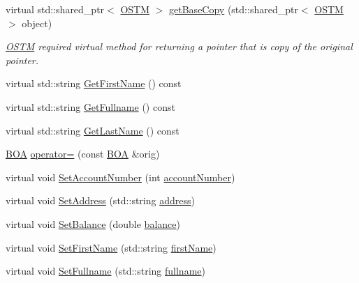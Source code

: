 \begin{DoxyCompactItemize}
\item 
virtual std\+::shared\+\_\+ptr$<$ \hyperlink{class_o_s_t_m}{O\+S\+TM} $>$ \hyperlink{class_b_o_a_a46ace5d3c945a423e93912673cadfad5_a46ace5d3c945a423e93912673cadfad5}{get\+Base\+Copy} (std\+::shared\+\_\+ptr$<$ \hyperlink{class_o_s_t_m}{O\+S\+TM} $>$ object)
\begin{DoxyCompactList}\small\item\em \hyperlink{class_o_s_t_m}{O\+S\+TM} required virtual method for returning a pointer that is copy of the original pointer. \end{DoxyCompactList}\item 
virtual std\+::string \hyperlink{class_b_o_a_ae6bb3df4e1fb210610325ffd1985c7c0_ae6bb3df4e1fb210610325ffd1985c7c0}{Get\+First\+Name} () const 
\item 
virtual std\+::string \hyperlink{class_b_o_a_afafa24a20fda93382782cab66a3079ee_afafa24a20fda93382782cab66a3079ee}{Get\+Fullname} () const 
\item 
virtual std\+::string \hyperlink{class_b_o_a_a081383edefc1f66b80c3fb8862ab070b_a081383edefc1f66b80c3fb8862ab070b}{Get\+Last\+Name} () const 
\item 
\hyperlink{class_b_o_a}{B\+OA} \hyperlink{class_b_o_a_af24b66f0e072b29abbbe5812cab48369_af24b66f0e072b29abbbe5812cab48369}{operator=} (const \hyperlink{class_b_o_a}{B\+OA} \&orig)
\item 
virtual void \hyperlink{class_b_o_a_a6b85963680344bd719ab862a50a09588_a6b85963680344bd719ab862a50a09588}{Set\+Account\+Number} (int \hyperlink{class_b_o_a_a86ca4ad716db205f04c337b39b34d9ba_a86ca4ad716db205f04c337b39b34d9ba}{account\+Number})
\item 
virtual void \hyperlink{class_b_o_a_a2568c0027af6534bd08dde882e892caf_a2568c0027af6534bd08dde882e892caf}{Set\+Address} (std\+::string \hyperlink{class_b_o_a_afb2d7d0c5c05169a72bbc6f1d2cc737f_afb2d7d0c5c05169a72bbc6f1d2cc737f}{address})
\item 
virtual void \hyperlink{class_b_o_a_a0e06a7b7669b6a26a41b37d68f0a87b8_a0e06a7b7669b6a26a41b37d68f0a87b8}{Set\+Balance} (double \hyperlink{class_b_o_a_a2061c36a15924de9186ec5c83dc7da2f_a2061c36a15924de9186ec5c83dc7da2f}{balance})
\item 
virtual void \hyperlink{class_b_o_a_a32fabc2b3acde832f3749696b302a0fe_a32fabc2b3acde832f3749696b302a0fe}{Set\+First\+Name} (std\+::string \hyperlink{class_b_o_a_acb1b3b2a69e403c4e0e3fb08fdbb52a0_acb1b3b2a69e403c4e0e3fb08fdbb52a0}{first\+Name})
\item 
virtual void \hyperlink{class_b_o_a_a7ff134d56805088f46df8eb6f21a0a45_a7ff134d56805088f46df8eb6f21a0a45}{Set\+Fullname} (std\+::string \hyperlink{class_b_o_a_aed3225e383c08b1b7c962a0e43b180d1_aed3225e383c08b1b7c962a0e43b180d1}{fullname})

\end{DoxyCompactItemize}
